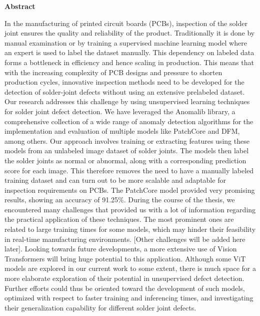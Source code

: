 
\begin{center}
\bfseries
{Abstract}
\normalfont
\end{center}
\sloppy
In the manufacturing of printed circuit boards (PCBs), inspection of the solder joint ensures the quality and reliability of the product. Traditionally it is done by manual examination or by training a supervised machine learning model where an expert is used to label the dataset manually. This dependency on labeled data forms a bottleneck in efficiency and hence scaling in production. This means that with the increasing complexity of PCB designs and pressure to shorten production cycles, innovative inspection methods need to be developed for the detection of solder-joint defects without using an extensive prelabeled dataset.
Our research addresses this challenge by using unsupervised learning techniques for solder joint defect detection. We have leveraged the Anomalib library, a comprehensive collection of a wide range of anomaly detection algorithms for the implementation and evaluation of multiple models like PatchCore and DFM, among others. Our approach involves training or extracting features using these models from an unlabeled image dataset of solder joints. The models then label the solder joints as normal or abnormal, along with a corresponding prediction score for each image. This therefore removes the need to have a manually labeled training dataset and can turn out to be more scalable and adaptable for inspection requirements on PCBs. The PatchCore model provided very promising results, showing an accuracy of 91.25\%.
During the course of the thesis, we encountered many challenges that provided us with a lot of information regarding the practical application of these techniques. The most prominent ones are related to large training times for some models, which may hinder their feasibility in real-time manufacturing environments. [Other challenges will be added here later]. Looking towards future developments, a more extensive use of Vision Transformers will bring huge potential to this application. Although some ViT models are explored in our current work to some extent, there is much space for a more elaborate exploration of their potential in unsupervised defect detection. Further efforts could thus be oriented toward the development of such models, optimized with respect to faster training and inferencing times, and investigating their generalization capability for different solder joint defects.